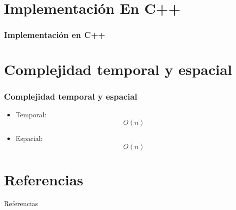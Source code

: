 \documentclass[17pt, t, lualatex]{beamer}
\begin{document}
\section{Implementación En C++}

\insertsectionpage

\begin{frame}
  \frametitle{Implementación en C++}

 \scalebox{0.4}{}

\end{frame}

\section{Complejidad temporal y espacial}

\insertsectionpage

\begin{frame}
  \frametitle{Complejidad temporal y espacial}

  \begin{itemize}
    \item Temporal:
          \[O(n)\]
    \item Espacial:
          \[O(n)\]
  \end{itemize}

\end{frame}





\section{Referencias}

\insertsectionpage
\begin{frame}[allowframebreaks]{Referencias}
  \printbibliography
\end{frame}


\insertendpage
\end{document}
